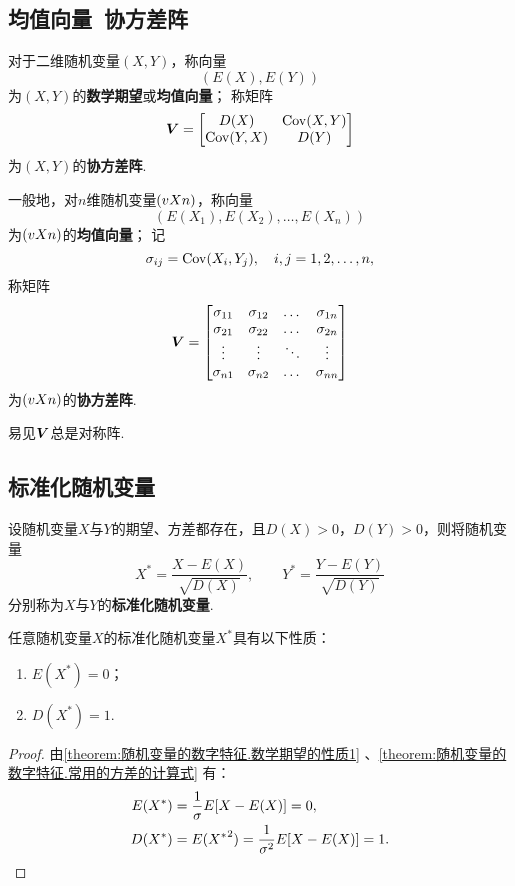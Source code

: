 \subsection{均值向量\ 协方差阵}
\begin{definition}
对于二维随机变量\((X,Y)\)，称向量\[
(E(X),E(Y))
\]为\((X,Y)\)的\textbf{数学期望}或\textbf{均值向量}；
称矩阵\[
\boldsymbol{V} = \begin{bmatrix}
D(X) & \operatorname{Cov}(X,Y) \\
\operatorname{Cov}(Y,X) & D(Y)
\end{bmatrix}
\]为\((X,Y)\)的\textbf{协方差阵}.

一般地，对\(n\)维随机变量\((v{X}{n})\)，称向量\[
(E(X_1),E(X_2),\dotsc,E(X_n))
\]为\((v{X}{n})\)的\textbf{均值向量}；
记\[
\sigma_{ij} = \operatorname{Cov}(X_i,Y_j),
\quad i,j=1,2,\dotsc,n,
\]称矩阵\[
\boldsymbol{V} = \begin{bmatrix}
\sigma_{11} & \sigma_{12} & \dots & \sigma_{1n} \\
\sigma_{21} & \sigma_{22} & \dots & \sigma_{2n} \\
\vdots & \vdots & \ddots & \vdots \\
\sigma_{n1} & \sigma_{n2} & \dots & \sigma_{nn}
\end{bmatrix}
\]为\((v{X}{n})\)的\textbf{协方差阵}.
\end{definition}

易见\(\boldsymbol{V}\)总是对称阵.

\subsection{标准化随机变量}
\begin{definition}
设随机变量\(X\)与\(Y\)的期望、方差都存在，且\(D(X) > 0\)，\(D(Y) > 0\)，则将随机变量\[
X^* = \frac{X-E(X)}{\sqrt{D(X)}},
\qquad
Y^* = \frac{Y-E(Y)}{\sqrt{D(Y)}}
\]分别称为\(X\)与\(Y\)的\textbf{标准化随机变量}.
\end{definition}

\begin{property}\label{theorem:随机变量的数字特征.标准化随机变量的数字特征}
任意随机变量\(X\)的标准化随机变量\(X^*\)具有以下性质：
\begin{enumerate}
\item \(E(X^*)=0\)；
\item \(D(X^*)=1\).
\end{enumerate}
\begin{proof}
由\cref{theorem:随机变量的数字特征.数学期望的性质1} 、\cref{theorem:随机变量的数字特征.常用的方差的计算式} 有：\begin{align*}
E(X^*) &= \frac{1}{\sigma} E[X-E(X)] = 0, \\
D(X^*) &= E({X^*}^2) = \frac{1}{\sigma^2} E[X-E(X)] = 1.
\qedhere
\end{align*}
\end{proof}
\end{property}

